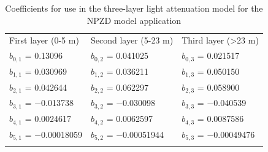 \documentclass[gmd, manuscript]{copernicus}
\begin{document}
%
\appendixtables
\begin{table}[t]
\caption{Coefficients for use in the three-layer light attenuation model for the NPZD model application}
\begin{tabular}{l l l}
\tophline
First layer (0-5 m) & Second layer (5-23 m) & Third layer (>23 m)\\
\middlehline

$b_{0,1}$ = 0.13096 & $b_{0,2}$ = 0.041025 & $b_{0,3}$ = 0.021517 \\

$b_{1,1}$ = 0.030969 & $b_{1,2}$ = 0.036211 & $b_{1,3}$ = 0.050150 \\

$b_{2,1}$ = 0.042644 & $b_{2,2}$ = 0.062297 & $b_{2,3}$ = 0.058900 \\

$b_{3,1}$ = −0.013738 & $b_{3,2}$ = −0.030098 & $b_{3,3}$ = −0.040539 \\

$b_{4,1}$ = 0.0024617 & $b_{4,2}$ = 0.0062597 & $b_{4,3}$ = 0.0087586 \\

$b_{5,1}$ = −0.00018059 & $b_{5,2}$ = −0.00051944 & $b_{5,3}$ = −0.00049476 \\

\bottomhline
\end{tabular}
\label{Appendix:Table:LightLayerCoefficients}
\end{table}

\noappendix       %



\end{document}
